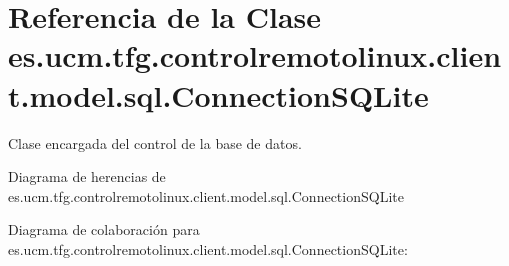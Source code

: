 \hypertarget{classes_1_1ucm_1_1tfg_1_1controlremotolinux_1_1client_1_1model_1_1sql_1_1ConnectionSQLite}{\section{Referencia de la Clase es.\-ucm.\-tfg.\-controlremotolinux.\-client.\-model.\-sql.\-Connection\-S\-Q\-Lite}
\label{classes_1_1ucm_1_1tfg_1_1controlremotolinux_1_1client_1_1model_1_1sql_1_1ConnectionSQLite}
}


Clase encargada del control de la base de datos.  




Diagrama de herencias de es.\-ucm.\-tfg.\-controlremotolinux.\-client.\-model.\-sql.\-Connection\-S\-Q\-Lite


Diagrama de colaboración para es.\-ucm.\-tfg.\-controlremotolinux.\-client.\-model.\-sql.\-Connection\-S\-Q\-Lite\-:
